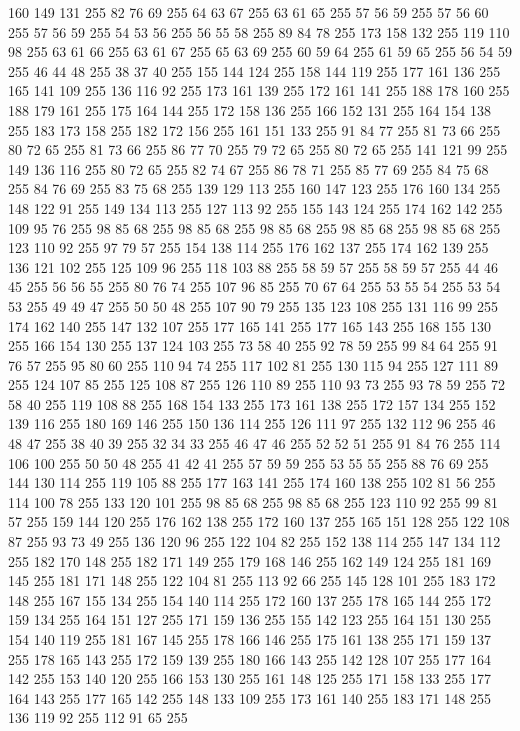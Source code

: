 160 149 131 255 82 76 69 255 64 63 67 255 63 61 65 255 57 56 59 255 57 56 60 255 57 56 59 255 54 53 56 255 56 55 58 255 89 84 78 255 173 158 132 255 119 110 98 255 63 61 66 255 63 61 67 255 65 63 69 255 60 59 64 255 61 59 65 255 56 54 59 255 46 44 48 255 38 37 40 255 155 144 124 255 158 144 119 255 177 161 136 255 165 141 109 255 136 116 92 255 173 161 139 255 172 161 141 255 188 178 160 255 188 179 161 255 175 164 144 255 172 158 136 255 166 152 131 255 164 154 138 255 183 173 158 255 182 172 156 255 161 151 133 255 91 84 77 255 81 73 66 255 80 72 65 255 81 73 66 255 86 77 70 255 79 72 65 255 80 72 65 255 141 121 99 255 149 136 116 255 80 72 65 255 82 74 67 255 86 78 71 255 85 77 69 255 84 75 68 255 84 76 69 255 83 75 68 255 139 129 113 255 160 147 123 255 176 160 134 255 148 122 91 255 149 134 113 255 127 113 92 255 155 143 124 255 174 162 142 255 109 95 76 255 98 85 68 255 98 85 68 255 98 85 68 255
98 85 68 255 98 85 68 255 123 110 92 255 97 79 57 255 154 138 114 255 176 162 137 255 174 162 139 255 136 121 102 255 125 109 96 255 118 103 88 255 58 59 57 255 58 59 57 255 44 46 45 255 56 56 55 255 80 76 74 255 107 96 85 255 70 67 64 255 53 55 54 255 53 54 53 255 49 49 47 255 50 50 48 255 107 90 79 255 135 123 108 255 131 116 99 255 174 162 140 255 147 132 107 255 177 165 141 255 177 165 143 255 168 155 130 255 166 154 130 255 137 124 103 255 73 58 40 255 92 78 59 255 99 84 64 255 91 76 57 255 95 80 60 255 110 94 74 255 117 102 81 255 130 115 94 255 127 111 89 255 124 107 85 255 125 108 87 255 126 110 89 255 110 93 73 255 93 78 59 255 72 58 40 255 119 108 88 255 168 154 133 255 173 161 138 255 172 157 134 255 152 139 116 255 180 169 146 255 150 136 114 255 126 111 97 255 132 112 96 255 46 48 47 255 38 40 39 255 32 34 33 255 46 47 46 255 52 52 51 255 91 84 76 255 114 106 100 255 50 50 48 255 41 42 41 255
57 59 59 255 53 55 55 255 88 76 69 255 144 130 114 255 119 105 88 255 177 163 141 255 174 160 138 255 102 81 56 255 114 100 78 255 133 120 101 255 98 85 68 255 98 85 68 255 123 110 92 255 99 81 57 255 159 144 120 255 176 162 138 255 172 160 137 255 165 151 128 255 122 108 87 255 93 73 49 255 136 120 96 255 122 104 82 255 152 138 114 255 147 134 112 255 182 170 148 255 182 171 149 255 179 168 146 255 162 149 124 255 181 169 145 255 181 171 148 255 122 104 81 255 113 92 66 255 145 128 101 255 183 172 148 255 167 155 134 255 154 140 114 255 172 160 137 255 178 165 144 255 172 159 134 255 164 151 127 255 171 159 136 255 155 142 123 255 164 151 130 255 154 140 119 255 181 167 145 255 178 166 146 255 175 161 138 255 171 159 137 255 178 165 143 255 172 159 139 255 180 166 143 255 142 128 107 255 177 164 142 255 153 140 120 255 166 153 130 255 161 148 125 255 171 158 133 255 177 164 143 255 177 165 142 255 148 133 109 255 173 161 140 255 183 171 148 255 136 119 92 255 112 91 65 255
